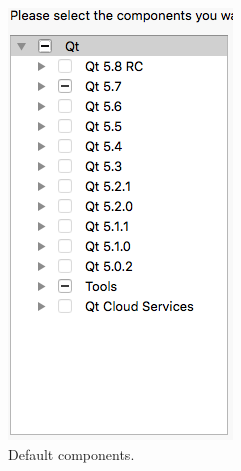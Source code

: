 \begin{figure} [h] %
\centering
\begin{subfigure}{.333\textwidth}
  \centering
  \includegraphics[width=.9\textwidth]{graphics/qt-setup-osx-1.png}
  \caption{Default components.}
\end{subfigure}%
\begin{subfigure}{.333\textwidth}
  \centering

\end{subfigure}
\end{figure}
